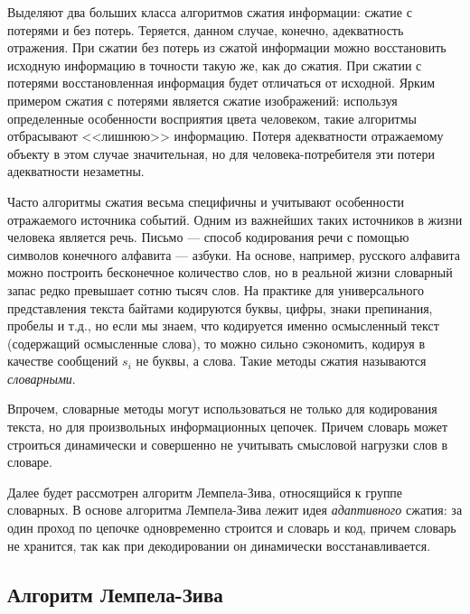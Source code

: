 Выделяют два больших класса алгоритмов сжатия информации: сжатие с потерями и без потерь. Теряется, данном случае, конечно, адекватность отражения. При сжатии без потерь из сжатой информации можно восстановить исходную информацию в точности такую же, как до сжатия. При сжатии с потерями восстановленная информация будет отличаться от исходной. Ярким примером сжатия с потерями является сжатие изображений: используя определенные особенности восприятия цвета человеком, такие алгоритмы отбрасывают <<лишнюю>> информацию. Потеря адекватности отражаемому объекту в этом случае значительная, но для человека-потребителя эти потери адекватности незаметны.

Часто алгоритмы сжатия весьма специфичны и учитывают особенности отражаемого источника событий. Одним из важнейших таких источников в жизни человека является речь. Письмо --- способ кодирования речи с помощью символов конечного алфавита --- азбуки. На основе, например, русского алфавита можно построить бесконечное количество слов, но в реальной жизни словарный запас редко превышает сотню тысяч слов. На практике для универсального представления текста байтами кодируются буквы, цифры, знаки препинания, пробелы и т.д., но если мы знаем, что кодируется именно осмысленный текст (содержащий осмысленные слова), то можно сильно сэкономить, кодируя в качестве сообщений $s_i$ не буквы, а слова. Такие методы сжатия называются \emph{словарными}. 

Впрочем, словарные методы могут использоваться не только для кодирования текста, но для произвольных информационных цепочек. Причем словарь может строиться динамически и совершенно не учитывать смысловой нагрузки слов в словаре.

Далее будет рассмотрен алгоритм Лемпела-Зива, относящийся к группе словарных. В основе алгоритма Лемпела-Зива лежит идея \emph{адаптивного} сжатия: за один проход по цепочке одновременно строится и словарь и код, причем словарь не хранится, так как при декодировании он динамически восстанавливается.


\subsection{Алгоритм Лемпела-Зива}

